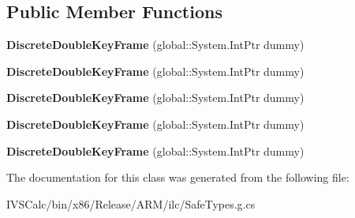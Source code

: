 \subsection*{Public Member Functions}
\begin{DoxyCompactItemize}
\item 
\mbox{\label{class_windows_1_1_u_i_1_1_xaml_1_1_media_1_1_animation_1_1_discrete_double_key_frame_a3249a0d6f297aa85c45f918b0d74d692}} 
{\bfseries Discrete\+Double\+Key\+Frame} (global\+::\+System.\+Int\+Ptr dummy)
\item 
\mbox{\label{class_windows_1_1_u_i_1_1_xaml_1_1_media_1_1_animation_1_1_discrete_double_key_frame_a3249a0d6f297aa85c45f918b0d74d692}} 
{\bfseries Discrete\+Double\+Key\+Frame} (global\+::\+System.\+Int\+Ptr dummy)
\item 
\mbox{\label{class_windows_1_1_u_i_1_1_xaml_1_1_media_1_1_animation_1_1_discrete_double_key_frame_a3249a0d6f297aa85c45f918b0d74d692}} 
{\bfseries Discrete\+Double\+Key\+Frame} (global\+::\+System.\+Int\+Ptr dummy)
\item 
\mbox{\label{class_windows_1_1_u_i_1_1_xaml_1_1_media_1_1_animation_1_1_discrete_double_key_frame_a3249a0d6f297aa85c45f918b0d74d692}} 
{\bfseries Discrete\+Double\+Key\+Frame} (global\+::\+System.\+Int\+Ptr dummy)
\item 
\mbox{\label{class_windows_1_1_u_i_1_1_xaml_1_1_media_1_1_animation_1_1_discrete_double_key_frame_a3249a0d6f297aa85c45f918b0d74d692}} 
{\bfseries Discrete\+Double\+Key\+Frame} (global\+::\+System.\+Int\+Ptr dummy)
\end{DoxyCompactItemize}


The documentation for this class was generated from the following file\+:\begin{DoxyCompactItemize}
\item 
I\+V\+S\+Calc/bin/x86/\+Release/\+A\+R\+M/ilc/Safe\+Types.\+g.\+cs\end{DoxyCompactItemize}
